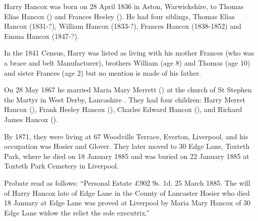 
Harry Hancox was born on 28 April 1836 in Aston, Warwickshire, to Thomas Elias Hancox () and Frances Heeley ().  He had four siblings, Thomas Elias Hancox (1831-?), William Hancox (1833-?), Frances Hancox (1838-1852) and Emma Hancox (1847-?). 

In the 1841 Census, Harry was listed as living with his mother Frances (who was a brace and belt Manufacturer), brothers William (age 8) and Thomas (age 10) and sister Frances (age 2) but no mention is made of his father. \cite{HarryHancoxBirth}

On 28 May 1867 he married Maria Mary Merrett () at the church of St Stephen the Martyr in West Derby, Lancashire \cite{HarryHancoxMarriage}.  They had four children: Harry Merret Hancox (), Frank Heeley Hancox (), Charles Edward Hancox (), and Richard James Hancox ().

By 1871, they were living at 67 Woodville Terrace, Everton, Liverpool, and his occupation was Hosier and Glover.\cite{HarryHancoxOccupation}  They later moved to 30 Edge Lane, Toxteth Park, where he died on 18 January 1885 \cite{HarryHancoxDeath} and was buried on 22 January 1885 at Toxteth Park Cemetery in Liverpool.\cite{HHGravestone}

Probate read as follows: ``Personal Estate \pounds 902 9s. 1d. 25 March 1885. The will of Harry Hancox late of Edge Lane in the County of Lancaster Hosier who died 18 January at Edge Lane was proved at Liverpool by Maria Mary Hancox of 30 Edge Lane widow the relict the sole executrix.''
